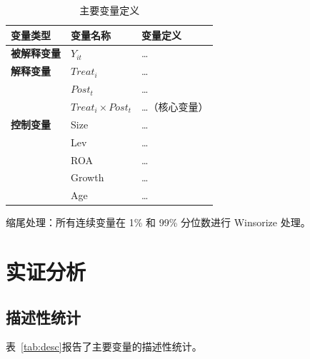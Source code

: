\documentclass[lang=cn, aaffiliation={中国}]{ctexart}
\begin{document}
\begin{table}[htbp]
    \centering
    \caption{主要变量定义}
    \label{tab:var_def}
    \begin{threeparttable}
        \begin{tabular}{p{2.5cm}p{2.5cm}p{5.5cm}}
            \toprule
            \textbf{变量类型} & \textbf{变量名称} & \textbf{变量定义} \\
            \midrule
            \textbf{被解释变量} & $Y_{it}$ & \dots \\
            \midrule
            \textbf{解释变量} & $Treat_i$ & \dots \\
              & $Post_t$ & \dots \\
              & $Treat_i \times Post_t$ & \dots（核心变量）\\
            \midrule
            \textbf{控制变量} & Size & \dots \\
              & Lev & \dots \\
              & ROA & \dots \\
              & Growth & \dots \\
              & Age & \dots \\
            \bottomrule
        \end{tabular}
        \begin{tablenotes}\footnotesize
            \item 缩尾处理：所有连续变量在 1\% 和 99\% 分位数进行 Winsorize 处理。
        \end{tablenotes}
    \end{threeparttable}
\end{table}

\section{实证分析}
\label{sec:results}

\subsection{描述性统计}
\label{sec:summary}

表~\ref{tab:desc}报告了主要变量的描述性统计。
\end{document}
